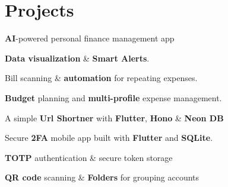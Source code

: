 \documentclass[]{deedy-resume-reversed}
\begin{document}
\begin{minipage}[t]{0.60\textwidth}

\section{Projects}

\begin{tightemize}

\item \textbf{AI}-powered personal finance management app 
\item \textbf{Data visualization} \& \textbf{Smart Alerts}.
\item Bill scanning \& \textbf{automation} for repeating expenses. 
\item \textbf{Budget} planning and \textbf{multi-profile} expense management.
\end{tightemize}
\sectionsep

\begin{tightemize}
\item A simple \textbf{Url Shortner} with \textbf{Flutter}, \textbf{Hono} \& \textbf{Neon DB}
\end{tightemize}

\sectionsep

\begin{tightemize}
\item Secure \textbf{2FA} mobile app built with \textbf{Flutter} and \textbf{SQLite}.
\item \textbf{TOTP} authentication \& secure token storage
\item \textbf{QR code} scanning \& \textbf{Folders} for grouping accounts
\end{tightemize}


\end{minipage}
\end{document}
